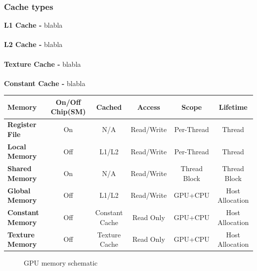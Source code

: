 \subsubsection{Cache types}
\label{sec-cac-types}
\textbf{L1 Cache -} blabla
\\\\
\textbf{L2 Cache -} blabla
\\\\
\textbf{Texture Cache -} blabla
\\\\
\textbf{Constant Cache -} blabla

\begin{table}[]
	\begin{tabular}{|l|c|c|c|c|c|}
		\hline
		\textbf{Memory}          & \textbf{On/Off Chip(SM)} & \textbf{Cached} & \textbf{Access} & \textbf{Scope} & \textbf{Lifetime} \\ \hline
		\textbf{Register File}  & On                   & N/A             & Read/Write      & Per-Thread     & Thread            \\ \hline
		\textbf{Local Memory}    & Off                  & L1/L2           & Read/Write      & Per-Thread     & Thread            \\ \hline
		\textbf{Shared Memory}   & On                   & N/A             & Read/Write      & Thread Block   & Thread Block      \\ \hline
		\textbf{Global Memory}   & Off                  & L1/L2           & Read/Write      & GPU+CPU        & Host Allocation   \\ \hline
		\textbf{Constant Memory} & Off                  & Constant Cache  & Read Only       & GPU+CPU        & Host Allocation   \\ \hline
		\textbf{Texture Memory}  & Off                  & Texture Cache   & Read Only       & GPU+CPU        & Host Allocation   \\ \hline
	\end{tabular}
	\centering
	\label{alg-gpu-mem}
\end{table}

\begin{figure}[H]
	\centering
	\caption{GPU memory schematic}
	\label{fig:hw-memory-schematic}
\end{figure}

